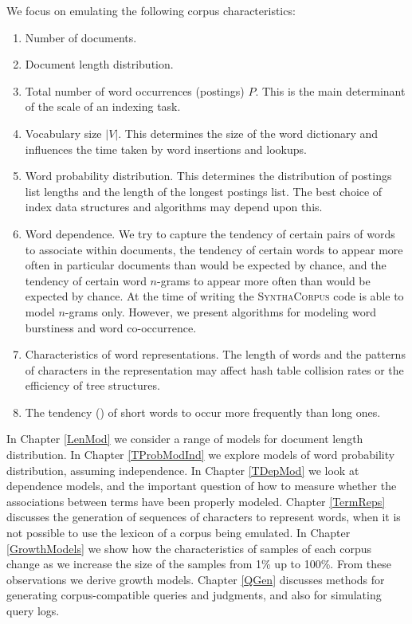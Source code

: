 \documentclass[11pt]{report}
\begin{document}
We focus on emulating the following corpus characteristics:
\begin{enumerate}
\item Number of documents.
\item Document length distribution.   
\item Total number of word occurrences (postings) $P$.  This is the main
  determinant of the scale of an indexing task.
\item Vocabulary size $|V|$.  This determines the size of the word
  dictionary and influences the time taken by word insertions and
  lookups.
\item Word probability distribution.  This determines the distribution
  of postings list lengths and the length of the longest postings
  list.  The best choice of index data structures and algorithms may 
  depend upon this. 
\item Word dependence.  We try to capture the tendency of certain
  pairs of words to associate within documents, the tendency of
  certain words to appear more often in particular documents than
  would be expected by chance, and the tendency of certain word
  $n$-grams to appear more often than would be expected by chance.
  At the time of writing the \textsc{SynthaCorpus} code is able to model
  $n$-grams only.  However, we present algorithms for modeling word
  burstiness and word co-occurrence.
\item Characteristics of word representations.  The length of words
  and the patterns of characters in the representation may affect 
  hash table collision rates or the efficiency of tree structures.
\item The tendency (\cite{zipf1935psycho}) of short words to
  occur more frequently than long ones.
\end{enumerate}

In Chapter \ref{LenMod} we consider a range of models for document 
length distribution. In Chapter \ref{TProbModInd} we explore models of
word probability distribution, assuming independence.  In Chapter
\ref{TDepMod} we look at dependence models, and the important question
of how to measure whether the associations between terms have been
properly modeled.  Chapter \ref{TermReps} discusses the generation of
sequences of characters to represent words, when it is not possible to
use the lexicon of a corpus being emulated.  In Chapter
\ref{GrowthModels} we show how the characteristics of
samples of each corpus change as we increase the size of the samples
from 1\% up to 100\%.  From these observations we derive growth
models. Chapter \ref{QGen}
discusses methods for generating corpus-compatible queries and
judgments, and also for simulating query logs.
\end{document}
